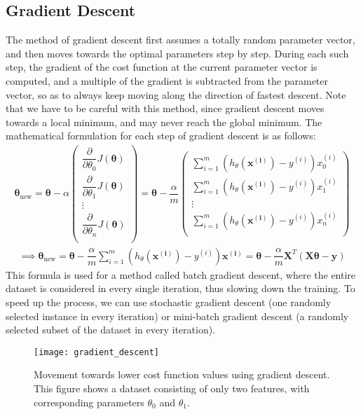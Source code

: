 \documentclass[a4paper, 12pt]{article}
\begin{document}
\subsection{Gradient Descent}
The method of gradient descent first assumes a totally random parameter vector, and then moves towards the optimal parameters step by step. During each such step, the gradient of the cost function at the current parameter vector is computed, and a multiple of the gradient is subtracted from the parameter vector, so as to always keep moving along the direction of fastest descent. Note that we have to be careful with this method, since gradient descent moves towards a local minimum, and may never reach the global minimum.
The mathematical formulation for each step of gradient descent is as follows:
\begin{align*}
\bm{\theta}_{\text{new}} = \bm{\theta} - \alpha
\begin{pmatrix}
\dfrac{\partial}{\partial \theta_0}J\left(\bm{\theta}\right) \\
\dfrac{\partial}{\partial \theta_1}J\left(\bm{\theta}\right) \\
\vdots \\
\dfrac{\partial}{\partial \theta_n}J\left(\bm{\theta}\right) \\
\end{pmatrix}
= \bm{\theta} - \dfrac{\alpha}{m}
\begin{pmatrix}
\sum_{i=1}^{m}\left(h_{\theta}\left(\bm{x^{\left(i\right)}}\right)-y^{\left(i\right)}\right)x_0^{\left(i\right)} \\
\sum_{i=1}^{m}\left(h_{\theta}\left(\bm{x^{\left(i\right)}}\right)-y^{\left(i\right)}\right)x_1^{\left(i\right)} \\
\vdots \\
\sum_{i=1}^{m}\left(h_{\theta}\left(\bm{x^{\left(i\right)}}\right)-y^{\left(i\right)}\right)x_n^{\left(i\right)} \\
\end{pmatrix}
\end{align*}
\begin{align*}
\implies \bm{\theta}_{\text{new}} = \bm{\theta} - \dfrac{\alpha}{m}\sum_{i=1}^{m}\left(h_{\theta}\left(\bm{x^{\left(i\right)}}\right)-y^{\left(i\right)}\right)\bm{x^{\left(i\right)}} = \bm{\theta} - \dfrac{\alpha}{m}\bm{X}^T\left(\bm{X\theta} - \bm{y}\right)
\end{align*}
This formula is used for a method called batch gradient descent, where the entire dataset is considered in every single iteration, thus slowing down the training. To speed up the process, we can use stochastic gradient descent (one randomly selected instance in every iteration) or mini-batch gradient descent (a randomly selected subset of the dataset in every iteration).
\begin{figure}[H]
\centering
\texttt{[image: gradient\_descent]}
\caption{Movement towards lower cost function values using gradient descent. This figure shows a dataset consisting of only two features, with corresponding parameters $\theta_0$ and $\theta_1$.}
\end{figure}
\end{document}
